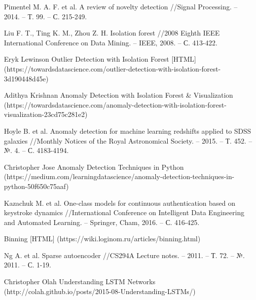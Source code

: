 \documentclass[12pt]{article}
\begin{document}
\begin{thebibliography}{20}
        Pimentel M. A. F. et al. A review of novelty detection //Signal Processing. – 2014. – Т. 99. – С. 215-249.

        Liu F. T., Ting K. M., Zhou Z. H. Isolation forest //2008 Eighth IEEE International Conference on Data Mining. – IEEE, 2008. – С. 413-422.

        Eryk Lewinson Outlier Detection with Isolation Forest [HTML] (https://towardsdatascience.com/outlier-detection-with-isolation-forest-3d190448d45e)

        Adithya Krishnan Anomaly Detection with Isolation Forest \& Visualization (https://towardsdatascience.com/anomaly-detection-with-isolation-forest-visualization-23cd75c281e2)

        Hoyle B. et al. Anomaly detection for machine learning redshifts applied to SDSS galaxies //Monthly Notices of the Royal Astronomical Society. – 2015. – Т. 452. – №. 4. – С. 4183-4194.

        Christopher Jose Anomaly Detection Techniques in Python (https://medium.com/learningdatascience/anomaly-detection-techniques-in-python-50f650c75aaf)

        Kazachuk M. et al. One-class models for continuous authentication based on keystroke dynamics //International Conference on Intelligent Data Engineering and Automated Learning. – Springer, Cham, 2016. – С. 416-425.

        Binning [HTML] (https://wiki.loginom.ru/articles/binning.html)

        Ng A. et al. Sparse autoencoder //CS294A Lecture notes. – 2011. – Т. 72. – №. 2011. – С. 1-19.

        Christopher Olah Understanding LSTM Networks (http://colah.github.io/posts/2015-08-Understanding-LSTMs/)
        
    \end{thebibliography}
\end{document}
